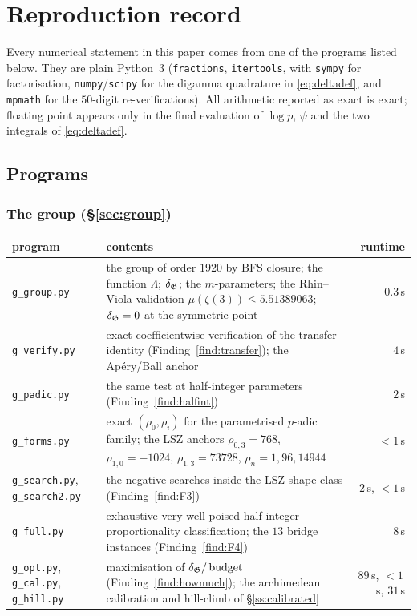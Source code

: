 \section{Reproduction record}\label{app:repro}

Every numerical statement in this paper comes from one of the programs listed below. They
are plain Python~3 (\texttt{fractions}, \texttt{itertools}, with \texttt{sympy} for
factorisation, \texttt{numpy}/\texttt{scipy} for the digamma quadrature in
\eqref{eq:deltadef}, and \texttt{mpmath} for the $50$-digit re-verifications). All
arithmetic reported as exact is exact; floating point appears only in the final evaluation
of $\log p$, $\psi$ and the two integrals of \eqref{eq:deltadef}.

\subsection{Programs}\label{ss:programs}

\subsubsection*{The group (\S\ref{sec:group})}
\begin{center}
\scriptsize\setlength{\tabcolsep}{4pt}
\begin{tabular}{lp{}r}
\toprule
program & contents & runtime\\
\midrule
\texttt{g\_group.py} & the group of order $1920$ by BFS closure; the function $\Lambda$;
  $\delta_{\mathfrak{G}}$; the $m$-parameters; the Rhin--Viola validation
  $\mu(\zeta(3))\le5.51389063$; $\delta_{\mathfrak{G}}=0$ at the symmetric point & $0.3$\,s\\
\texttt{g\_verify.py} & exact coefficientwise verification of the transfer identity
  (Finding~\ref{find:transfer}); the Ap\'ery/Ball anchor & $4$\,s\\
\texttt{g\_padic.py} & the same test at half-integer parameters
  (Finding~\ref{find:halfint}) & $2$\,s\\
\texttt{g\_forms.py} & exact $(\rho_0,\rho_i)$ for the parametrised $p$-adic family; the LSZ
  anchors $\rho_{0,3}=768$, $\rho_{1,0}=-1024$, $\rho_{1,3}=73728$, $\rho_n=1,96,14944$ & $<1$\,s\\
\texttt{g\_search.py}, \texttt{g\_search2.py} & the negative searches inside the LSZ shape
  class (Finding~\ref{find:F3}) & $2$\,s, $<1$\,s\\
\texttt{g\_full.py} & exhaustive very-well-poised half-integer proportionality
  classification; the $13$ bridge instances (Finding~\ref{find:F4}) & $8$\,s\\
\texttt{g\_opt.py}, \texttt{g\_cal.py}, \texttt{g\_hill.py} & maximisation of $\delta_{\mathfrak{G}}/\operatorname{budget}$
  (Finding~\ref{find:howmuch}); the archimedean calibration and hill-climb of
  \S\ref{ss:calibrated} & $89$\,s, $<1$\,s, $31$\,s\\
\bottomrule
\end{tabular}
\end{center}

